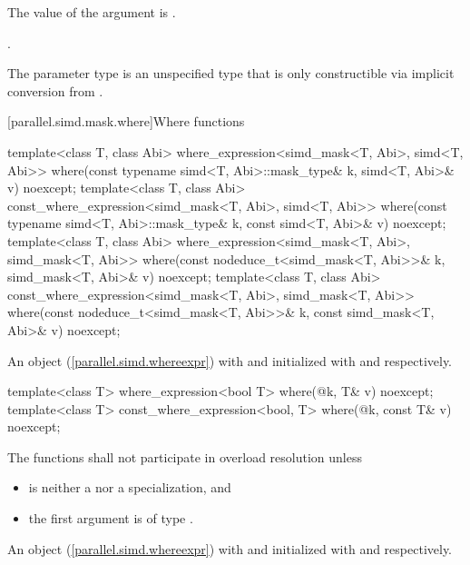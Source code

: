 \begin{itemdescr}
  \pnum\requires
  The value of the argument is .

  \pnum\returns
  .

  \pnum\remarks
  The parameter type  is an unspecified type that is only constructible via implicit conversion from .
\end{itemdescr}

[parallel.simd.mask.where]{Where functions}

\begin{itemdecl}
template<class T, class Abi>
  where_expression<simd_mask<T, Abi>, simd<T, Abi>> where(const typename simd<T, Abi>::mask_type& k,
                                                          simd<T, Abi>& v) noexcept;
template<class T, class Abi>
  const_where_expression<simd_mask<T, Abi>, simd<T, Abi>> where(const typename simd<T, Abi>::mask_type& k,
                                                                const simd<T, Abi>& v) noexcept;
template<class T, class Abi>
  where_expression<simd_mask<T, Abi>, simd_mask<T, Abi>> where(const nodeduce_t<simd_mask<T, Abi>>& k,
                                                               simd_mask<T, Abi>& v) noexcept;
template<class T, class Abi>
  const_where_expression<simd_mask<T, Abi>, simd_mask<T, Abi>> where(const nodeduce_t<simd_mask<T, Abi>>& k,
                                                                     const simd_mask<T, Abi>& v) noexcept;
\end{itemdecl}

\begin{itemdescr}
  \pnum\returns
  An object (\ref{parallel.simd.whereexpr}) with  and  initialized with  and  respectively.
\end{itemdescr}

\begin{itemdecl}
template<class T> where_expression<bool T> where(@\seebelow@ k, T& v) noexcept;
template<class T>
  const_where_expression<bool, T> where(@\seebelow@ k, const T& v) noexcept;
\end{itemdecl}

\begin{itemdescr}
  \pnum\remarks
  The functions shall not participate in overload resolution unless

  \begin{itemize}
    \item {} is neither a  nor a  specialization, and
    \item the first argument is of type .
  \end{itemize}

  \pnum\returns
  An object (\ref{parallel.simd.whereexpr}) with  and  initialized with  and  respectively.
\end{itemdescr}
